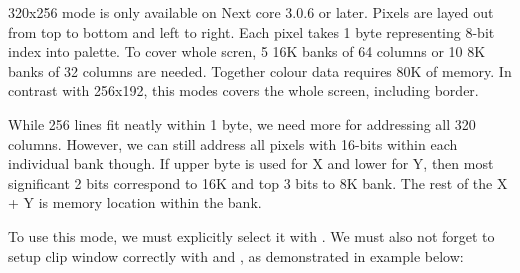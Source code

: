 \documentclass[12pt,twoside,openright,a4paper]{book}
\begin{document}
320x256 mode is only available on Next core 3.0.6 or later. Pixels are layed out from top to bottom and left to right. Each pixel takes 1 byte representing 8-bit index into palette. To cover whole scren, 5 16K banks of 64 columns or 10 8K banks of 32 columns are needed. Together colour data requires 80K of memory. In contrast with 256x192, this modes covers the whole screen, including border.

While 256 lines fit neatly within 1 byte, we need more for addressing all 320 columns. However, we can still address all pixels with 16-bits within each individual bank though. If upper byte is used for X and lower for Y, then most significant 2 bits correspond to 16K and top 3 bits to 8K bank. The rest of the X + Y is memory location within the bank.

To use this mode, we must explicitly select it with . We must also not forget to setup clip window correctly with  and , as demonstrated in example below:
\end{document}

